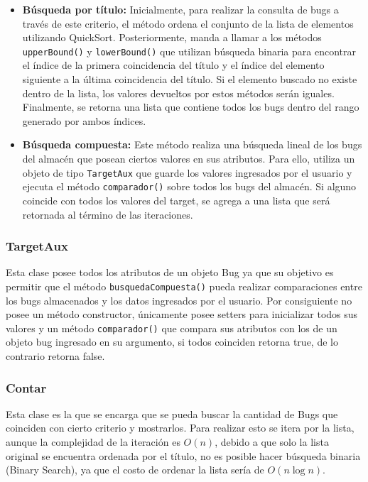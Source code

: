 \documentclass[12pt,letterpaper]{article}
\begin{document}
\begin{itemize}
    \item \textbf{Búsqueda por título:} Inicialmente, para realizar la consulta de bugs a través de este criterio, el método ordena el conjunto de la lista de elementos utilizando QuickSort. Posteriormente, manda a llamar a los métodos \texttt{upperBound()} y \texttt{lowerBound()} que utilizan búsqueda binaria para encontrar el índice de la primera coincidencia del título y el índice del elemento siguiente a la última coincidencia del título. Si el elemento buscado no existe dentro de la lista, los valores devueltos por estos métodos serán iguales. Finalmente, se retorna una lista que contiene todos los bugs dentro del rango generado por ambos índices.
    \item \textbf{Búsqueda compuesta:} Este método realiza una búsqueda lineal de los bugs del almacén que posean ciertos valores en sus atributos. Para ello, utiliza un objeto de tipo \texttt{TargetAux} que guarde los valores ingresados por el usuario y ejecuta el método \texttt{comparador()} sobre todos los bugs del almacén. Si alguno coincide con todos los valores del target, se agrega a una lista que será retornada al término de las iteraciones.
\end{itemize}

\subsubsection*{TargetAux}
Esta clase posee todos los atributos de un objeto Bug ya que su objetivo es permitir que el método \texttt{busquedaCompuesta()} pueda realizar comparaciones entre los bugs almacenados y los datos ingresados por el usuario. Por consiguiente no posee un método constructor, únicamente posee setters para inicializar todos sus valores y un método \texttt{comparador()} que compara sus atributos con los de un objeto bug ingresado en su argumento, si todos coinciden retorna true, de lo contrario retorna false. 


\subsubsection*{Contar}
Esta clase es la que se encarga que se pueda buscar la cantidad de Bugs que coinciden con cierto criterio y mostrarlos. Para realizar esto se itera por la lista, aunque la complejidad de la iteración es $O(n)$, debido a que solo la lista original se encuentra ordenada por el título, no es posible hacer búsqueda binaria (Binary Search), ya que el costo de ordenar la lista sería de $O(n \log n)$.
\end{document}
